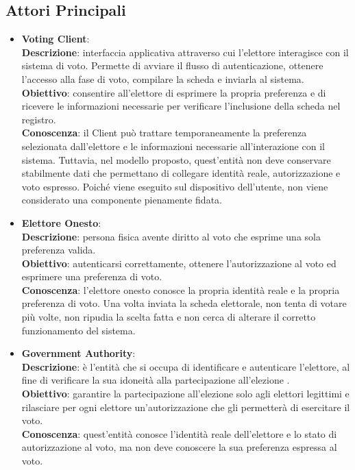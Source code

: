 \documentclass[a4paper,12pt]{article}
\begin{document}
    \subsection{Attori Principali}
    \begin{itemize}
        \item \textbf{Voting Client}:\\
            \textbf{Descrizione}: interfaccia applicativa attraverso cui l'elettore interagisce con il sistema di voto.
            Permette di avviare il flusso di autenticazione, ottenere l'accesso alla fase di voto, compilare la scheda
            e inviarla al sistema.\\
            \textbf{Obiettivo}: consentire all'elettore di esprimere la propria preferenza e di ricevere le informazioni
            necessarie per verificare l'inclusione della scheda nel registro.\\
            \textbf{Conoscenza}: il Client può trattare temporaneamente la preferenza selezionata dall'elettore e le
            informazioni necessarie all'interazione con il sistema. Tuttavia, nel modello proposto, quest'entità non deve conservare stabilmente
            dati che permettano di collegare identità reale, autorizzazione e voto espresso. Poiché viene eseguito sul
            dispositivo dell'utente, non viene considerato una componente pienamente fidata.

        
        \item \textbf{Elettore Onesto}:\\
            \textbf{Descrizione}: persona fisica avente diritto al voto che esprime una sola preferenza valida.\\
            \textbf{Obiettivo}: autenticarsi correttamente, ottenere l'autorizzazione al voto ed esprimere una preferenza di voto.\\
            \textbf{Conoscenza}: l'elettore onesto conosce la propria identità reale e la propria preferenza di voto. 
            Una volta inviata la scheda elettorale, non tenta di votare più volte, non ripudia la scelta fatta e non cerca di alterare il corretto funzionamento del sistema.

        \item \textbf{Government Authority}:\\
            \textbf{Descrizione}: è l'entità che si occupa di identificare e autenticare l'elettore, al fine di verificare la sua idoneità alla partecipazione all'elezione .\\
            \textbf{Obiettivo}: garantire la partecipazione all'elezione solo agli elettori legittimi e rilasciare per ogni elettore un'autorizzazione che gli permetterà di esercitare il voto.\\
            \textbf{Conoscenza}: quest'entità  conosce l'identità reale dell'elettore e lo stato di autorizzazione al voto, ma non deve conoscere la sua preferenza espressa al voto.


\end{itemize}
\end{document}
